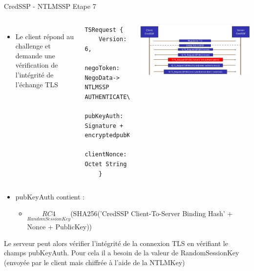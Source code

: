 \documentclass{beamer}
\begin{document}
\begin{frame}[fragile]{CredSSP - NTLMSSP Etape 7}
	 \begin{columns}[T]
	 	\begin{itemize}
	 	\item Le client répond au challenge et demande une vérification de l'intégrité de l'échange TLS
	 	\end{itemize}
	 \begin{lstlisting}[frame=single,basicstyle=\tiny]
TSRequest {
	Version:     6,
	negoToken:   NegoData-> NTLMSSP AUTHENTICATE\_MESSAGE,
	pubKeyAuth: Signature + encryptedpubKey,
	clientNonce: Octet String
	}
	\end{lstlisting}
	 \includegraphics[scale=0.055]{step7.jpg}
	 \end{columns}
	 
	 \begin{itemize}
	 	\item pubKeyAuth contient :
	 		\begin{itemize}
	 		\item $\underset{RandomSessionKey}{RC4}$(SHA256('CredSSP Client-To-Server Binding Hash' + Nonce + PublicKey))
	 		\end{itemize}
	 	\end{itemize}
	 	
Le serveur peut alors vérifier l'intégrité de la connexion TLS en vérifiant le champs pubKeyAuth.
Pour cela il a besoin de la valeur de RandomSessionKey (envoyée par le client mais chiffrée à l'aide de la NTLMKey)
\end{frame}
\end{document}
